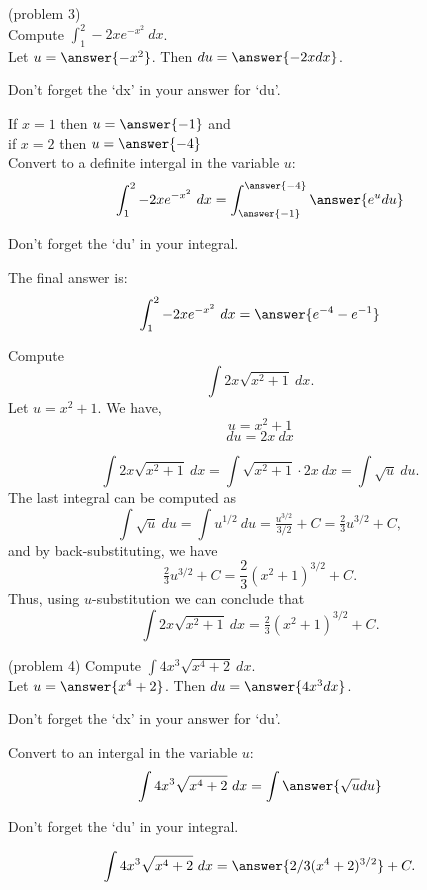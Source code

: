 \documentclass{ximera}
\begin{document}
\begin{problem}(problem 3)\\
Compute $\displaystyle{\int_1^2 -2xe^{-x^2} \ dx}$.\\
Let $u = \answer{-x^2}$. Then $du = \answer{-2x dx}$.\\
\begin{hint}
Don't forget the `dx' in your answer for `du'.
\end{hint}
If $x = 1$ then $u = \answer{-1}$ and \\
if $x = 2$ then $u = \answer{-4}$\\
Convert to a definite intergal in the variable $u$:
\[\int_1^2 -2xe^{-x^2} \ dx = \int_{\answer{-1}}^{\answer{-4}} \answer{e^u du}\]
\begin{hint}
Don't forget the `du' in your integral.
\end{hint}
The final answer is:
\[\int_1^2 -2xe^{-x^2} \ dx = \answer{e^{-4} - e^{-1}} \]
\end{problem}

\begin{example}[example 4] Compute 
\[\int 2x\sqrt{x^2 + 1} \ dx.\]
Let $u = x^2 + 1$.  We have,
\[u = x^2 + 1\]
\[du = 2x \ dx\]

\[\int 2x\sqrt{x^2 + 1} \ dx = \int \sqrt{x^2 + 1} \cdot 2x\  dx = \int \sqrt{u} \ du.\]
The last integral can be computed as 
\[\int \sqrt u  \ du = \int u^{1/2} \ du = \tfrac{u^{3/2}}{3/2} + C = \tfrac23 u^{3/2} + C,\]
and by back-substituting, we have 
\[\tfrac23 u^{3/2}  + C = \frac23 (x^2 + 1)^{3/2} + C.\]
Thus, using $u$-substitution we can conclude that
\[\int 2x\sqrt{x^2 + 1} \ dx =  \tfrac23 (x^2 + 1)^{3/2} + C.\]
\end{example}

\begin{problem}(problem 4) Compute $\displaystyle{\int 4x^3 \sqrt{x^4 +2} \ dx}$.\\
Let $u = \answer{x^4 + 2}$. Then $du = \answer{4x^3 dx}$.\\
\begin{hint}
Don't forget the `dx' in your answer for `du'.
\end{hint}
Convert to an intergal in the variable $u$:
\[\int 4x^3 \sqrt{x^4 +2} \ dx = \int\answer{\sqrt u du}\]
\begin{hint}
Don't forget the `du' in your integral.
\end{hint}

\[\int 4x^3 \sqrt{x^4 +2} \ dx = \answer{2/3(x^4 +2)^{3/2}} +C.\]
\end{problem}
\end{document}
